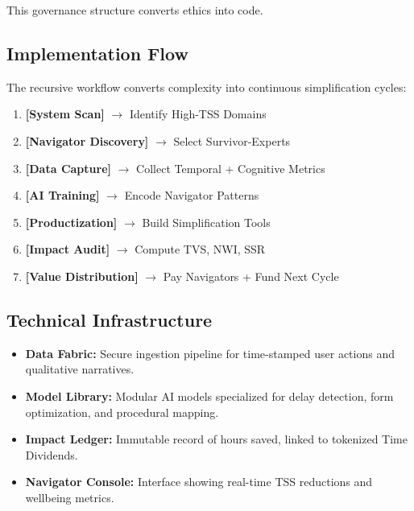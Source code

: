 This governance structure converts ethics into code.

\subsection{Implementation Flow}
\label{sec:impl-flow}

The recursive workflow converts complexity into continuous simplification cycles:

\begin{enumerate}
    \item \textbf{[System Scan]} $\to$ Identify High-TSS Domains
    \item \textbf{[Navigator Discovery]} $\to$ Select Survivor-Experts
    \item \textbf{[Data Capture]} $\to$ Collect Temporal + Cognitive Metrics
    \item \textbf{[AI Training]} $\to$ Encode Navigator Patterns
    \item \textbf{[Productization]} $\to$ Build Simplification Tools
    \item \textbf{[Impact Audit]} $\to$ Compute TVS, NWI, SSR
    \item \textbf{[Value Distribution]} $\to$ Pay Navigators + Fund Next Cycle
\end{enumerate}

\subsection{Technical Infrastructure}
\label{sec:tech-infrastructure}

\begin{itemize}
    \item \textbf{Data Fabric:} Secure ingestion pipeline for time-stamped user actions and qualitative narratives.
    \item \textbf{Model Library:} Modular AI models specialized for delay detection, form optimization, and procedural mapping.
    \item \textbf{Impact Ledger:} Immutable record of hours saved, linked to tokenized Time Dividends.
    \item \textbf{Navigator Console:} Interface showing real-time TSS reductions and wellbeing metrics.
\end{itemize}

